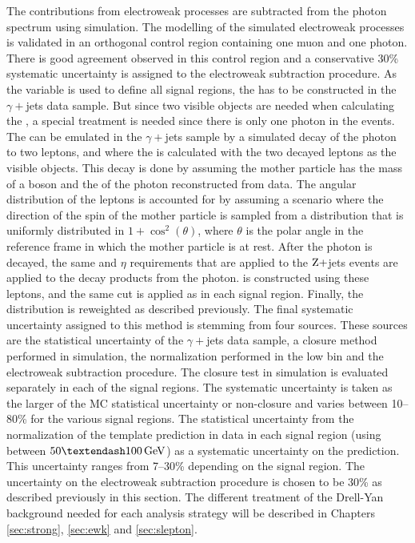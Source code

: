 The contributions from electroweak processes are subtracted from the photon \ptmiss spectrum using simulation. 
The modelling of the simulated electroweak processes is validated in an orthogonal control region containing one muon and one photon. 
There is good agreement observed in this control region and a conservative 30\% systematic uncertainty is assigned to the electroweak subtraction procedure.   
\newpara
\noindent\justify
As the \mttwo variable is used to define all signal regions, the \mttwo has to be constructed in the $\gamma+$jets data sample. 
But since two visible objects are needed when calculating the \mttwo, a special treatment is needed since there is only one photon in the events. 
The \mttwol can be emulated in the $\gamma+$jets sample by a simulated decay of the photon to two leptons, and where the \mttwol is calculated with the two decayed leptons as the visible objects.
This decay is done by assuming the mother particle has the mass of a \PZ boson and the \pt of the photon reconstructed from data. 
The angular distribution of the leptons is accounted for by assuming a scenario where the direction of the spin of the mother particle is sampled from a distribution that is uniformly distributed in $1+\cos^{2}(\theta)$, where $\theta$ is the polar angle in the reference frame in which the mother particle is at rest. 
After the photon is decayed, the same \pt and $\eta$ requirements that are applied to the $\mathrm{Z}+$jets events are applied to the decay products from the photon. 
\mttwol is constructed using these leptons, and the same cut is applied as in each signal region. 
Finally, the \pt distribution is reweighted as described previously.
\newpara
\noindent\justify
The final systematic uncertainty assigned to this method is stemming from four sources. 
These sources are the statistical uncertainty of the $\gamma+$jets data sample, a closure method performed in simulation, the normalization performed in the low \ptmiss bin and the electroweak subtraction procedure. 
The closure test in simulation is evaluated separately in each of the signal regions. 
The systematic uncertainty is taken as the larger of the MC statistical uncertainty or non-closure and varies between 10–80\% for the various signal regions.
The statistical uncertainty from the normalization of the template prediction in data in each signal region (using \ptmiss between $50–100\GeV$) as a systematic uncertainty on the prediction. 
This uncertainty ranges from 7–30\% depending on the signal region.
The uncertainty on the electroweak subtraction procedure is chosen to be 30\% as described previously in this section. 
The different treatment of the Drell-Yan background needed for each analysis strategy will be described in Chapters \ref{sec:strong}, \ref{sec:ewk} and \ref{sec:slepton}.          

